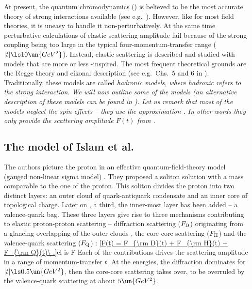 At present, the quantum chromodynamics () is believed to be the most accurate theory of strong interactions available (see e.g.~). However, like for most field theories, it is uneasy to handle it non-perturbatively. At the same time perturbative calculations of elastic scattering amplitude fail because of the strong coupling being too large in the typical four-momentum-transfer range ($|t| \ls 10\un{GeV^2}$). Instead, elastic scattering is described and studied with models that are more or less -inspired. The most frequent theoretical grounds are the Regge theory and eikonal description (see e.g.~Chs.~5 and 6 in ). Traditionally, these models are called \em{hadronic models}, where hadronic refers to the strong interaction. We will now outline some of the models (an alternative description of these models can be found in ). Let us remark that most of the models neglect the spin effects -- they use the approximation . In other words they only provide the scattering amplitude $F(t)$ from .


\subsection{The model of Islam et al.}

The authors picture the proton in an effective quantum-field-theory model (gauged non-linear sigma model) . They proposed a soliton solution with a mass comparable to the one of the proton. This soliton divides the proton into two distinct layers: an outer cloud of quark-antiquark condensate and an inner core of topological charge. Later on , a third, the inner-most layer has been added -- a valence-quark bag. These three layers give rise to three mechanisms contributing to elastic proton-proton scattering -- diffraction scattering ($F_{\rm D}$) originating from a glancing overlapping of the outer clouds , the core-core scattering ($F_{\rm H}$)  and the valence-quark scattering ($F_{\rm Q}$) :
\eqref{F(t) = F_{\rm D}(t) + F_{\rm H}(t) + F_{\rm Q}(t)\ .}{el is F}
Each of the contributions drives the scattering amplitude in a range of momentum-transfer $t$. At the  energies, the diffraction dominates for $|t| \ls 0.5\un{GeV^2}$, then the core-core scattering takes over, to be overruled by the valence-quark scattering at about $5\un{GeV^2}$.

